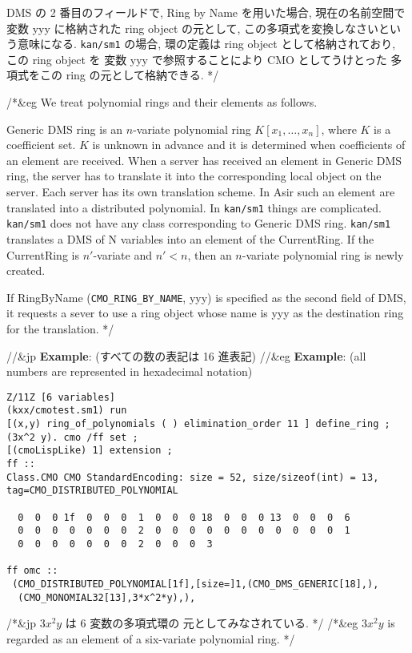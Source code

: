 DMS の 2 番目のフィールドで,
Ring by Name を用いた場合, 現在の名前空間で変数 yyy に格納された ring object
の元として, この多項式を変換しなさいという意味になる.
{\tt kan/sm1} の場合, 環の定義は ring object として格納されており,
この ring object を 変数 yyy で参照することにより CMO としてうけとった
多項式をこの ring の元として格納できる.
*/

/*&eg
We treat polynomial rings and their elements as follows.

Generic DMS ring is an $n$-variate polynomial ring $K[x_1, \ldots, x_n]$,
where $K$ is a coefficient set. $K$ is unknown in advance
and it is determined when coefficients of an element are received.
When a server has received an element in Generic DMS ring,
the server has to translate it into the corresponding local object
on the server. Each server has its own translation scheme.
In Asir such an element are translated into a distributed polynomial.
In {\tt kan/sm1} things are complicated.
{\tt kan/sm1} does not have any class corresponding to Generic DMS ring.
{\tt kan/sm1} translates a DMS of N variables into an element of
the CurrentRing. 
If the CurrentRing is $n'$-variate and $n' < n$, then
an $n$-variate polynomial ring is newly created. 


If RingByName ({\tt CMO\_RING\_BY\_NAME}, yyy) 
is specified as the second field of DMS,
it requests a sever to use a ring object whose name is yyy
as the destination ring for the translation.
*/

\medbreak \noindent
//&jp {\bf Example}: (すべての数の表記は 16 進表記)
//&eg {\bf Example}: (all numbers are represented in hexadecimal notation)
{\footnotesize \begin{verbatim}
Z/11Z [6 variables]
(kxx/cmotest.sm1) run
[(x,y) ring_of_polynomials ( ) elimination_order 11 ] define_ring ;
(3x^2 y). cmo /ff set ;
[(cmoLispLike) 1] extension ;
ff ::
Class.CMO CMO StandardEncoding: size = 52, size/sizeof(int) = 13, 
tag=CMO_DISTRIBUTED_POLYNOMIAL 

  0  0  0 1f  0  0  0  1  0  0  0 18  0  0  0 13  0  0  0  6
  0  0  0  0  0  0  0  2  0  0  0  0  0  0  0  0  0  0  0  1
  0  0  0  0  0  0  0  2  0  0  0  3

ff omc ::
 (CMO_DISTRIBUTED_POLYNOMIAL[1f],[size=]1,(CMO_DMS_GENERIC[18],),
  (CMO_MONOMIAL32[13],3*x^2*y),),
\end{verbatim} }
/*&jp
$ 3 x^2 y$ は 6 変数の多項式環の 元としてみなされている.
*/
/*&eg
$3 x^2 y$ is regarded as an element of a six-variate polynomial ring.
*/


